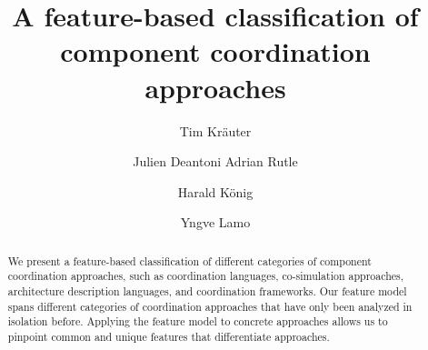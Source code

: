 \documentclass[runningheads]{llncs}
\begin{document}
\title{A feature-based classification of component coordination approaches}

\author{Tim Kr\"{a}uter \and
Julien Deantoni
Adrian Rutle \and
Harald K\"{o}nig \and
Yngve Lamo}
%
%
\maketitle

\begin{abstract}
We present a feature-based classification of different categories of component coordination approaches, such as coordination languages, co-simulation approaches, architecture description languages, and coordination frameworks.
Our feature model spans different categories of coordination approaches that have only been analyzed in isolation before.
Applying the feature model to concrete approaches allows us to pinpoint common and unique features that differentiate approaches.
\end{abstract}


\end{document}
